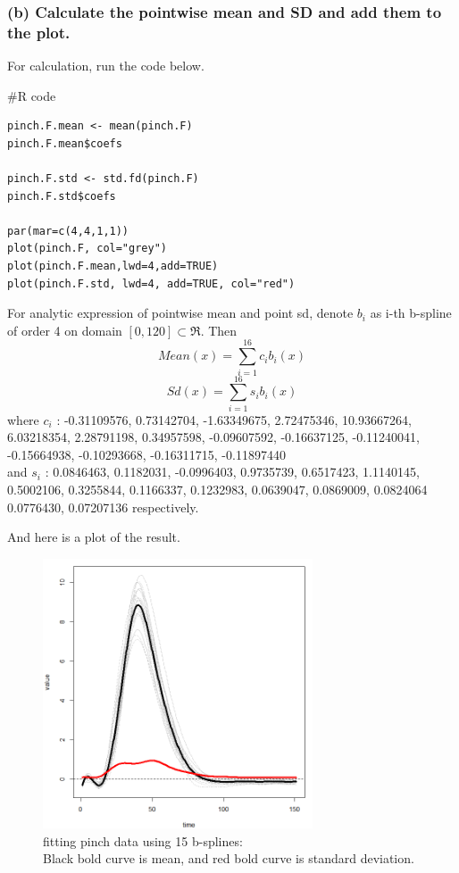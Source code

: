 \documentclass{article}
\newenvironment{Rcode}%
{%
    \begin{mdframed}
    \#R code
    \begin{small}
}
{%
    \end{small}
    \end{mdframed}
}
\begin{document}
\newpage
\subsubsection*{(b) Calculate the pointwise mean and SD and add them to the plot.}
For calculation, run the code below.
\begin{Rcode}
    \begin{verbatim}
pinch.F.mean <- mean(pinch.F)
pinch.F.mean$coefs

pinch.F.std <- std.fd(pinch.F)
pinch.F.std$coefs

par(mar=c(4,4,1,1))
plot(pinch.F, col="grey")
plot(pinch.F.mean,lwd=4,add=TRUE)
plot(pinch.F.std, lwd=4, add=TRUE, col="red")
    \end{verbatim}
\end{Rcode}

For analytic expression of pointwise mean and point sd, denote $b_i$ as i-th b-spline of order 4
on domain $[0,120] \subset \Re$. Then
\[Mean(x)=\sum_{i=1}^{16}c_ib_i(x)\]
\[Sd(x)=\sum_{i=1}^{16}s_ib_i(x)\]
where $c_i$ : -0.31109576, 0.73142704, -1.63349675, 2.72475346, 10.93667264, 6.03218354, 2.28791198, 0.34957598, -0.09607592, -0.16637125, -0.11240041, -0.15664938, -0.10293668, -0.16311715, -0.11897440
\\
and $s_i$ : 0.0846463, 0.1182031, -0.0996403, 0.9735739, 0.6517423, 1.1140145, 0.5002106, 0.3255844, 0.1166337, 0.1232983, 0.0639047, 0.0869009, 0.0824064 0.0776430, 0.07207136
respectively. 

And here is a plot of the result.
\begin{figure}[hh]
    \centering
    \includegraphics[height=8cm]{pinch_F_mean_var_plot.png}
    \caption{fitting pinch data using 15 b-splines: \\ Black bold curve is mean, and red bold curve is standard deviation.}
\end{figure}
\end{document}
